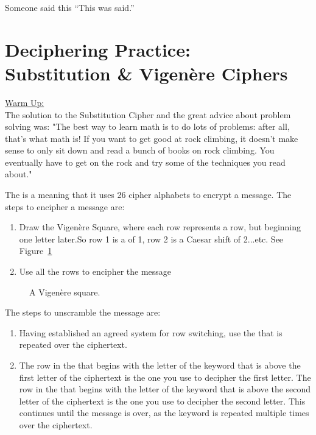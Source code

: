 \begin{chapquote}{Someone said this}
``This was said.''
\end{chapquote}

\section{Deciphering Practice: 
\\Substitution \& Vigen\`ere Ciphers}

\underline{Warm Up:}\\
The solution to the Substitution Cipher and the great advice about problem solving was: "The best way to learn math is to do lots of problems:  after all, that's what math is!  If you want to get good at rock climbing, it doesn't make sense to only sit down and read a bunch of books on rock climbing. You eventually have to get on the rock and try some of the techniques you read about."

The  is a  meaning that it uses 26 cipher alphabets to encrypt a message.
The steps to encipher a message are:
\begin{enumerate}
\item Draw the Vigen\`ere Square, where each row represents a  row, but beginning one letter later.So row 1 is a  of 1, row 2 is a Caesar shift of 2...etc.  See Figure~\ref{fig:VigSquare}
\item Use all the rows to encipher the message
\end{enumerate}


\begin{figure}
\centering
{}
\caption{A Vigen\`ere square.}
\label{fig:VigSquare}
\end{figure}

The steps to unscramble the message are:
\begin{enumerate}
\item Having established an agreed system for row switching, use the  that is repeated over the ciphertext.  
\item The row in the  that begins with the letter of the keyword that is above the first letter of the ciphertext is the one you use to decipher the first letter.  The row in the  that begins with the letter of the keyword that is above the second letter of the ciphertext is the one you use to decipher the second letter.  This continues until the message is over, as the keyword is repeated multiple times over the ciphertext.
\end{enumerate}


